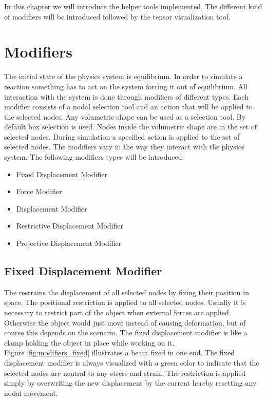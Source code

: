 
In this chapter we will introduce the helper tools implemented. The
different kind of modifiers will be introduced followed by the tensor
visualization tool.

\section{Modifiers}
\label{sec:modifiers}
The initial state of the physics system is equilibrium. In order to
simulate a reaction something has to act on the system forcing
it out of equilibrium. All interaction with the system is done
through modifiers of different types.
%
Each modifier consists of a nodal
selection tool and an action that will be applied to the selected
nodes.     
%
Any volumetric shape can be used as a selection tool. By default box
selection is used. Nodes inside the volumetric shape are in the set of 
selected nodes. During simulation a specified action is applied to the
set of selected nodes.
%
The modifiers vary in the way they interact with the physics
system. The following modifiers types will be introduced:

\begin{itemize}
\item Fixed Displacement Modifier
\item Force Modifier
\item Displacement Modifier
\item Restrictive Displacement Modifier
\item Projective Displacement Modifier
\end{itemize}

\subsection{Fixed Displacement Modifier}
The  restrains the
displacement of all selected nodes by fixing their position in
space. The positional restriction is applied to all selected
nodes. Usually it is
necessary to restrict part of the object when external forces are
applied. Otherwise the object would just move instead of causing
deformation, but of course this depends on the scenario. 
The fixed displacement modifier is like a clamp holding
the object in place while working on it. \\

Figure \vref{fig:modifiers_fixed} illustrates a beam fixed in one
end. The fixed displacement modifier is always visualized with a green
color to indicate that the selected nodes are neutral to any stress
and strain. The restriction
is applied simply by overwriting the new displacement by the current
hereby resetting any nodal movement.

